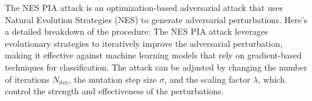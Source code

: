 The NES PIA attack is an optimization-based adversarial attack that uses Natural Evolution Strategies (NES) to generate adversarial perturbations. Here's a detailed breakdown of the procedure:
The NES PIA attack leverages evolutionary strategies to iteratively improve the adversarial perturbation, making it effective against machine learning models that rely on gradient-based techniques for classification. The attack can be adjusted by changing the number of iterations \(N_{\text{iter}}\), the mutation step size \(\sigma\), and the scaling factor \(\lambda\), which control the strength and effectiveness of the perturbations.